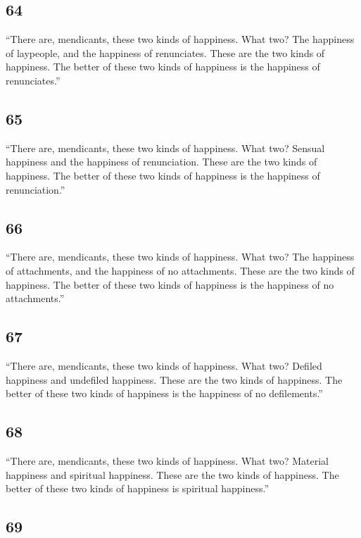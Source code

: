 \documentclass[12pt,openany]{book}%
\begin{document}
\subsection*{64 }

“There are, mendicants, these two kinds of happiness. What two? The happiness of laypeople, and the happiness of renunciates. These are the two kinds of happiness. The better of these two kinds of happiness is the happiness of renunciates.” 

\subsection*{65 }

“There are, mendicants, these two kinds of happiness. What two? Sensual happiness and the happiness of renunciation. These are the two kinds of happiness. The better of these two kinds of happiness is the happiness of renunciation.” 

\subsection*{66 }

“There are, mendicants, these two kinds of happiness. What two? The happiness of attachments, and the happiness of no attachments. These are the two kinds of happiness. The better of these two kinds of happiness is the happiness of no attachments.” 

\subsection*{67 }

“There are, mendicants, these two kinds of happiness. What two? Defiled happiness and undefiled happiness. These are the two kinds of happiness. The better of these two kinds of happiness is the happiness of no defilements.” 

\subsection*{68 }

“There are, mendicants, these two kinds of happiness. What two? Material happiness and spiritual happiness. These are the two kinds of happiness. The better of these two kinds of happiness is spiritual happiness.” 

\subsection*{69 }
\end{document}

